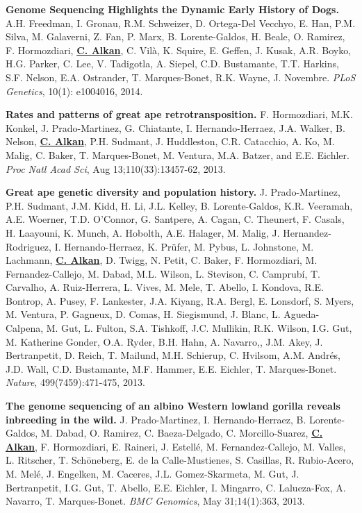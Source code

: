 \documentclass[margin,line]{res}
\begin{document}
\begin{resume}
 \vspace{-.2cm}        
        {\bf Genome Sequencing Highlights the Dynamic Early History of Dogs.}
        A.H. Freedman, I. Gronau, R.M. Schweizer, D. Ortega-Del Vecchyo, E. Han, P.M. Silva, M. Galaverni, Z. Fan, P. Marx, B. Lorente-Galdos, H. Beale, O. Ramirez, F. Hormozdiari, 
        {\bf {\underline{C. Alkan}}}, C. Vilà, K. Squire, E. Geffen, J. Kusak, A.R. Boyko, H.G. Parker, C. Lee, V. Tadigotla, A. Siepel, C.D. Bustamante, T.T. Harkins, 
        S.F. Nelson, E.A. Ostrander, T. Marques-Bonet, R.K. Wayne, J. Novembre. 
        {\em PLoS Genetics}, 10(1): e1004016, 2014.


 \vspace{-.2cm}        
        {\bf Rates and patterns of great ape retrotransposition.}
        F. Hormozdiari, M.K. Konkel, J. Prado-Martinez, G. Chiatante, I. Hernando-Herraez, J.A. Walker, B. Nelson, {\bf {\underline {C. Alkan}}}, P.H. Sudmant, J. Huddleston, C.R. Catacchio, A. Ko, 
        M. Malig, C. Baker, T. Marques-Bonet, M. Ventura, M.A. Batzer, and E.E. Eichler. 
        {\em Proc Natl Acad Sci}, Aug 13;110(33):13457-62, 2013.
                             

 \vspace{-.2cm}
        {\bf Great ape genetic diversity and population history.}
        J. Prado-Martinez, P.H. Sudmant, J.M. Kidd, H. Li, J.L. Kelley, B. Lorente-Galdos, K.R. Veeramah, A.E. Woerner, T.D. O’Connor, G. Santpere, A. Cagan, C. Theunert, F. Casals, H. Laayouni, K. Munch, A. Hobolth, A.E. Halager, M. Malig, J. Hernandez-Rodriguez, I. Hernando-Herraez, K. Prüfer, M. Pybus, L. Johnstone, M. Lachmann, {\bf {\underline {C. Alkan}}}, D. Twigg, N. Petit, C. Baker, F. Hormozdiari, M. Fernandez-Callejo, M. Dabad, M.L. Wilson, L. Stevison, C. Camprubí, T. Carvalho, A. Ruiz-Herrera, L. Vives, M. Mele, T. Abello, I. Kondova, R.E. Bontrop, A. Pusey, F. Lankester, J.A. Kiyang, R.A. Bergl, E. Lonsdorf, S. Myers, M. Ventura, P. Gagneux, D. Comas, H. Siegismund, J. Blanc, L. Agueda-Calpena, M. Gut, L. Fulton, S.A. Tishkoff, J.C. Mullikin, R.K. Wilson, I.G. Gut, M. Katherine Gonder, O.A. Ryder, B.H. Hahn, A. Navarro,, J.M. Akey, J. Bertranpetit, D. Reich, T. Mailund, M.H. Schierup, C. Hvilsom, A.M. Andrés, J.D. Wall, C.D. Bustamante, M.F. Hammer, E.E. Eichler, T. Marques-Bonet. 
        {\em Nature}, 499(7459):471-475, 2013.

\clearpage
 \vspace{-.2cm}
        {\bf The genome sequencing of an albino Western lowland gorilla reveals inbreeding in the wild.}
        J. Prado-Martinez, I. Hernando-Herraez, B. Lorente-Galdos, M. Dabad, O. Ramirez, C. Baeza-Delgado, C. Morcillo-Suarez, 
        {\bf {\underline {C. Alkan}}}, F. Hormozdiari, E. Raineri, J. Estellé, M. Fernandez-Callejo, M. Valles, L. Ritscher, T. Schöneberg, E. de la Calle-Mustienes, 
        S. Casillas, R. Rubio-Acero, M. Melé, J. Engelken, M. Caceres, J.L. Gomez-Skarmeta, M. Gut, J. Bertranpetit, I.G. Gut, T. Abello, 
        E.E. Eichler, I. Mingarro, C. Lalueza-Fox, A. Navarro, T. Marques-Bonet.
        {\em BMC Genomics}, May 31;14(1):363, 2013.



\end{resume}
\end{document}
